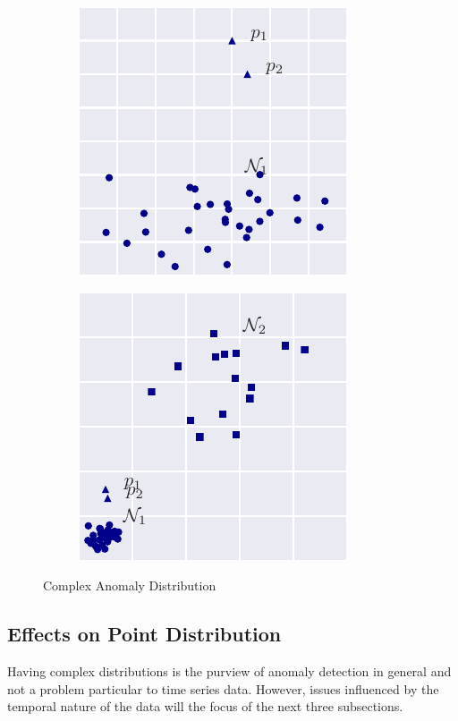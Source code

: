 \begin{figure}[H]
  \centering
  \begin{subfigure}[H]{2in}
    \includegraphics{figs/hard1_dist.pdf}
    \caption{}
    \label{fig:hard1_dist}
  \end{subfigure}
  \begin{subfigure}[H]{2in}
    \includegraphics{figs/hard2_dist.pdf}
    \caption{}
    \label{fig:hard2_dist}
  \end{subfigure}
  \caption{Complex Anomaly Distribution}
  \label{fig:hard_dist}
\end{figure}


\subsection{Effects on Point Distribution}

Having complex distributions is the purview of anomaly detection in general and not a problem particular to time series data. However, issues influenced by the temporal nature of the data will the focus of the next three subsections.

